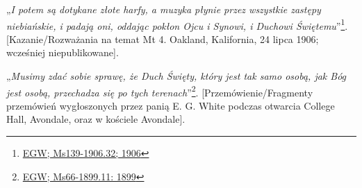 „\textit{I potem są dotykane złote harfy, a muzyka płynie przez wszystkie zastępy niebiańskie, i padają oni, oddając pokłon Ojcu i Synowi, i Duchowi Świętemu}”\footnote{\href{https://egwwritings.org/?ref=en_Ms139-1906.32&para=9579.38}{EGW; Ms139-1906.32; 1906}}. [Kazanie/Rozważania na temat Mt 4. Oakland, Kalifornia, 24 lipca 1906; wcześniej niepublikowane].

„\textit{Musimy zdać sobie sprawę, że Duch Święty, który jest tak samo osobą, jak Bóg jest osobą, przechadza się po tych terenach}”\footnote{\href{https://egwwritings.org/?ref=en_Ms66-1899.11&para=6622.19}{EGW; Ms66-1899.11: 1899}}. [Przemówienie/Fragmenty przemówień wygłoszonych przez panią E. G. White podczas otwarcia College Hall, Avondale, oraz w kościele Avondale].
